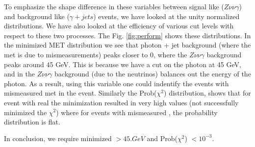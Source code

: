 To emphasize the shape difference in these variables between signal like ($Z\nu\nu\gamma$) and background like ($\gamma + jets$) events, we have looked at the unity normalized distributions. We have also looked at the efficiency of various cut levels with respect to these two processes. The Fig. \ref{fig:perform} shows these distributions. In the minimized MET distribution we see that photon + jet background (where the met is due to mismeasurements) peaks closer to 0, where the $Z\nu\nu\gamma$ background peaks around 45 GeV. This is because we have a cut on the photon \et at 45 GeV, and in the $Z\nu\nu\gamma$ background \met (due to the neutrinos) balances out the energy of the photon. As a result, using this variable one could indentify the events with mismeasured met in the event. Similarly the Prob($\chi^2$) distribution, shows that for event with real \met the minimization resulted in very high values (not successfully minimized the $\chi^2$) where for events with mismeasured \met, the probability distribution is flat.

In conclusion, we require minimized \met $> 45. GeV$ and Prob($\chi^2$) $ < 10^{-3}$.

